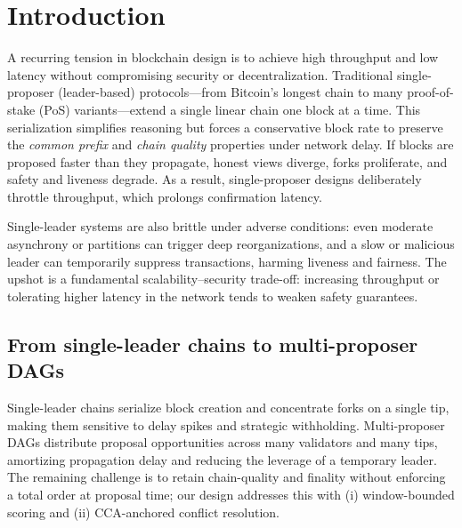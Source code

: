 
\vspace{-.3cm}

\vspace{-.3cm}
\section{Introduction}
\label{sec:intro}
\vspace{-.3cm}

A recurring tension in blockchain design is to achieve high throughput and low latency without compromising security or decentralization. Traditional single-proposer (leader-based) protocols---from Bitcoin's longest chain to many proof-of-stake (PoS) variants---extend a single linear chain one block at a time. This serialization simplifies reasoning but forces a conservative block rate to preserve the \emph{common prefix} and \emph{chain quality} properties under network delay. If blocks are proposed faster than they propagate, honest views diverge, forks proliferate, and safety and liveness degrade. As a result, single-proposer designs deliberately throttle throughput, which prolongs confirmation latency.

Single-leader systems are also brittle under adverse conditions: even moderate asynchrony or partitions can trigger deep reorganizations, and a slow or malicious leader can temporarily suppress transactions, harming liveness and fairness. The upshot is a fundamental scalability--security trade-off: increasing throughput or tolerating higher latency in the network tends to weaken safety guarantees.

\vspace{-.3cm}

\subsection{From single-leader chains to multi-proposer DAGs}
Single-leader chains serialize block creation and concentrate forks on a single tip, making them sensitive to delay spikes and strategic withholding.
Multi-proposer DAGs distribute proposal opportunities across many validators and many tips, amortizing propagation delay and reducing the leverage of a temporary leader.
The remaining challenge is to retain chain-quality and finality without enforcing a total order at proposal time; our design addresses this with (i) window-bounded scoring and (ii) CCA-anchored conflict resolution.

